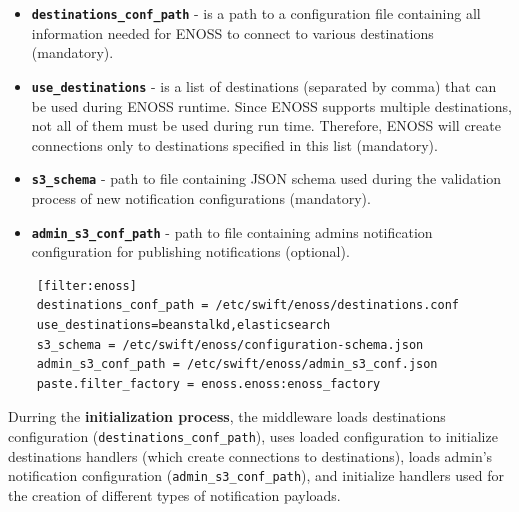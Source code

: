    \begin{itemize}
        \item \textbf{\texttt{destinations\_conf\_path}} - is a path to a configuration file containing all information needed for ENOSS to connect to various destinations (mandatory).
        \item \textbf{\texttt{use\_destinations}} - is a list of destinations (separated by comma) that can be used during ENOSS runtime. Since ENOSS supports multiple destinations, not all of them must be used during run time. Therefore, ENOSS will create connections only to destinations specified in this list (mandatory).
        \item \textbf{\texttt{s3\_schema}} - path to file containing JSON schema used during the validation process of new notification configurations (mandatory).
        \item \textbf{\texttt{admin\_s3\_conf\_path}} - path to file containing admins notification configuration for publishing notifications (optional).
    \end{itemize}

    \lstset{
        caption=Example ENOSS middleware configuration stored in the Proxy server configuration (proxy-server.conf).,
        label=lst:middlewareConfig1
    }
    \begin{lstlisting}
    [filter:enoss]
    destinations_conf_path = /etc/swift/enoss/destinations.conf
    use_destinations=beanstalkd,elasticsearch
    s3_schema = /etc/swift/enoss/configuration-schema.json
    admin_s3_conf_path = /etc/swift/enoss/admin_s3_conf.json
    paste.filter_factory = enoss.enoss:enoss_factory
    \end{lstlisting}

    Durring the \textbf{initialization process}, the middleware loads destinations configuration (\texttt{destinations\_conf\_path}), uses loaded configuration to initialize destinations handlers (which create connections to destinations), loads admin's notification configuration (\texttt{admin\_s3\_conf\_path}), and initialize handlers used for the creation of different types of notification payloads.

